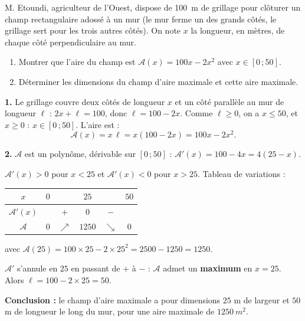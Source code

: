 \documentclass[11pt]{article}
\begin{document}
\begin{exoresolu}
M. Etoundi, agriculteur de l'Ouest, dispose de \SI{100}{m} de grillage pour clôturer un champ rectangulaire adossé à un mur (le mur ferme un des grands côtés, le grillage sert pour les trois autres côtés). On note $x$ la longueur, en mètres, de chaque côté perpendiculaire au mur.
\begin{enumerate}
\item Montrer que l'aire du champ est $\mathcal{A}(x)=100x-2x^2$ avec $x\in[0\,;50]$.
\item Déterminer les dimensions du champ d'aire maximale et cette aire maximale.
\end{enumerate}
\tcblower
\textbf{1.} Le grillage couvre deux côtés de longueur $x$ et un côté parallèle au mur de longueur $\ell$ : $2x+\ell=100$, donc $\ell=100-2x$. Comme $\ell\geq 0$, on a $x\leq 50$, et $x\geq 0$ : $x\in[0\,;50]$. L'aire est :
\[
\mathcal{A}(x)=x\,\ell=x(100-2x)=100x-2x^2.
\]

\textbf{2.} $\mathcal{A}$ est un polynôme, dérivable sur $[0\,;50]$ : $\mathcal{A}'(x)=100-4x=4(25-x)$.

$\mathcal{A}'(x)>0$ pour $x<25$ et $\mathcal{A}'(x)<0$ pour $x>25$. Tableau de variations :

\begin{center}
\begin{tabular}{|c|ccccc|}\hline
$x$ & $0$ & & $25$ & & $50$ \\ \hline
$\mathcal{A}'(x)$ & & $+$ & $0$ & $-$ & \\ \hline
$\mathcal{A}$ & $0$ & $\nearrow$ & $1250$ & $\searrow$ & $0$ \\ \hline
\end{tabular}
\end{center}

avec $\mathcal{A}(25)=100\times 25-2\times 25^2=2500-1250=1250$.

$\mathcal{A}'$ s'annule en $25$ en passant de $+$ à $-$ : $\mathcal{A}$ admet un \textbf{maximum} en $x=25$. Alors $\ell=100-2\times 25=50$.

\textbf{Conclusion :} le champ d'aire maximale a pour dimensions $25$ m de largeur et $50$ m de longueur le long du mur, pour une aire maximale de $\SI{1250}{m^2}$.
\end{exoresolu}
\end{document}
